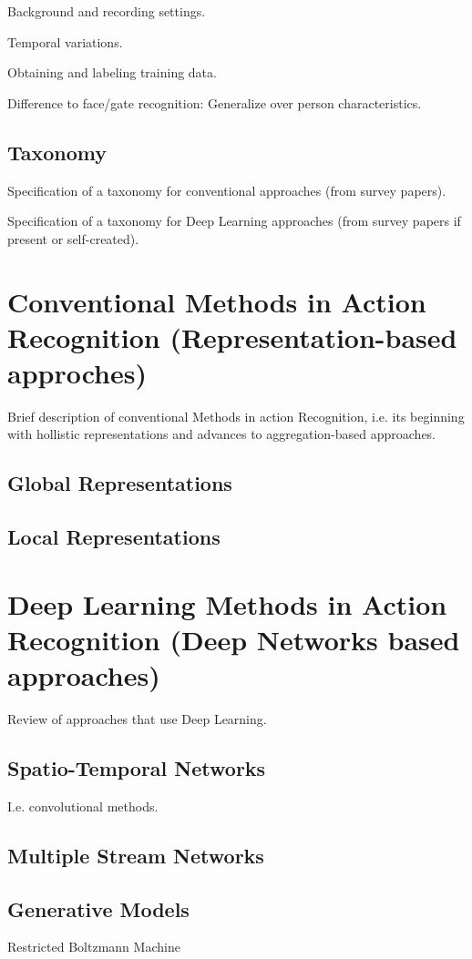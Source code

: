 \documentclass{scrartcl}
\begin{document}
Background and recording settings.

Temporal variations.

Obtaining and labeling training data.

Difference to face/gate recognition: Generalize over person characteristics.

\subsection{Taxonomy}
Specification of a taxonomy for conventional approaches (from survey papers).

Specification of a taxonomy for Deep Learning approaches (from survey papers if present or self-created).

\section{Conventional Methods in Action Recognition (Representation-based approches)}
Brief description of conventional Methods in action Recognition, i.e. its beginning with hollistic representations and advances to aggregation-based approaches.

\subsection{Global Representations}

\subsection{Local Representations}

\section{Deep Learning Methods in Action Recognition (Deep Networks based approaches)}
Review of approaches that use Deep Learning.

\subsection{Spatio-Temporal Networks}
I.e. convolutional methods.

\subsection{Multiple Stream Networks}

\subsection{Generative Models}
Restricted Boltzmann Machine
\end{document}
